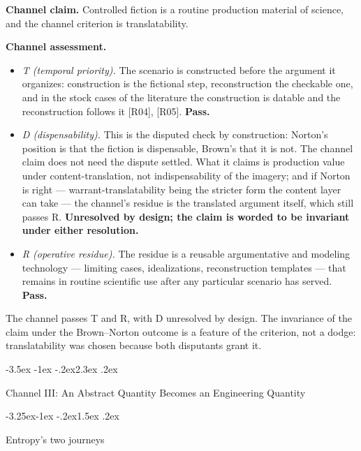 \documentclass[11pt,a4paper]{article}
\makeatletter
\renewcommand\section{\@startsection{section}{1}{\z@}%
  {-3.5ex \@plus -1ex \@minus -.2ex}{2.3ex \@plus .2ex}%
  {\normalfont\Large\bfseries\raggedright}}
\renewcommand\subsection{\@startsection{subsection}{2}{\z@}%
  {-3.25ex\@plus -1ex \@minus -.2ex}{1.5ex \@plus .2ex}%
  {\normalfont\large\bfseries\raggedright}}
\makeatother
\begin{document}
\textbf{Channel claim.} Controlled fiction is a routine production material of science, and the channel criterion is translatability.

\textbf{Channel assessment.}

\begin{itemize}[leftmargin=1.6em,itemsep=2pt,parsep=0pt,topsep=3pt]
\item \textit{T (temporal priority).} The scenario is constructed before the argument it organizes: construction is the fictional step, reconstruction the checkable one, and in the stock cases of the literature the construction is datable and the reconstruction follows it [R04], [R05]. \textbf{Pass.}
\item \textit{D (dispensability).} This is the disputed check by construction: Norton's position is that the fiction is dispensable, Brown's that it is not. The channel claim does not need the dispute settled. What it claims is production value under content-translation, not indispensability of the imagery; and if Norton is right — warrant-translatability being the stricter form the content layer can take — the channel's residue is the translated argument itself, which still passes R. \textbf{Unresolved by design; the claim is worded to be invariant under either resolution.}
\item \textit{R (operative residue).} The residue is a reusable argumentative and modeling technology — limiting cases, idealizations, reconstruction templates — that remains in routine scientific use after any particular scenario has served. \textbf{Pass.}
\end{itemize}

The channel passes T and R, with D unresolved by design. The invariance of the claim under the Brown–Norton outcome is a feature of the criterion, not a dodge: translatability was chosen because both disputants grant it.

\section{Channel III: An Abstract Quantity Becomes an Engineering Quantity}

\subsection{Entropy's two journeys}
\end{document}
